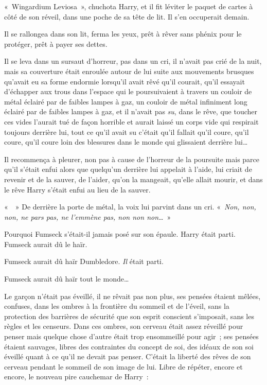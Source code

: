 «~Wingardium Leviosa~», chuchota Harry, et il fit léviter le paquet de cartes à côté de son réveil, dans une poche de sa tête de lit. Il s'en occuperait demain.

Il se rallongea dans son lit, ferma les yeux, prêt à rêver sans phénix pour le protéger, prêt à payer ses dettes.

\later

Il se leva dans un sursaut d'horreur, pas dans un cri, il n'avait pas crié de la nuit, mais sa couverture était enroulée autour de lui suite aux mouvements brusques qu'avait eu sa forme endormie lorsqu'il avait rêvé qu'il courait, qu'il essayait d'échapper aux trous dans l'espace qui le poursuivaient à travers un couloir de métal éclairé par de faibles lampes à gaz, un couloir de métal infiniment long éclairé par de faibles lampes à gaz, et il n'avait pas \emph{su}, dans le rêve, que toucher ces vides l'aurait tué de façon horrible et aurait laissé un corps vide qui respirait toujours derrière lui, tout ce qu'il avait su c'était qu'il fallait qu'il coure, qu'il coure, qu'il coure loin des blessures dans le monde qui glissaient derrière lui…

Il recommença à pleurer, non pas à cause de l'horreur de la poursuite mais parce qu'il s'était enfui alors que quelqu'un derrière lui appelait à l'aide, lui criait de revenir et de la sauver, de l'aider, qu'on la mangeait, qu'elle allait mourir, et dans le rêve Harry s'était enfui au lieu de la sauver.

«~~» De derrière la porte de métal, la voix lui parvint dans un cri. «~\emph{Non, non, non, ne pars pas, ne l'emmène pas, non non non…}~»

Pourquoi Fumseck s'était-il jamais posé sur son épaule. Harry était parti. Fumseck aurait dû le haïr.

Fumseck aurait dû haïr Dumbledore. \emph{Il} était parti.

Fumseck aurait dû haïr tout le monde…

Le garçon n'était pas éveillé, il ne rêvait pas non plus, ses pensées étaient mêlées, confuses, dans les ombres à la frontière du sommeil et de l'éveil, sans la protection des barrières de sécurité que son esprit conscient s'imposait, sans les règles et les censeurs. Dans ces ombres, son cerveau était assez réveillé pour penser mais quelque chose d'autre était trop ensommeillé pour agir~; ses pensées étaient sauvages, libres des contraintes du concept de soi, des idéaux de son soi éveillé quant à ce qu'il ne devait pas penser. C'était la liberté des rêves de son cerveau pendant le sommeil de son image de lui. Libre de répéter, encore et encore, le nouveau pire cauchemar de Harry~:

